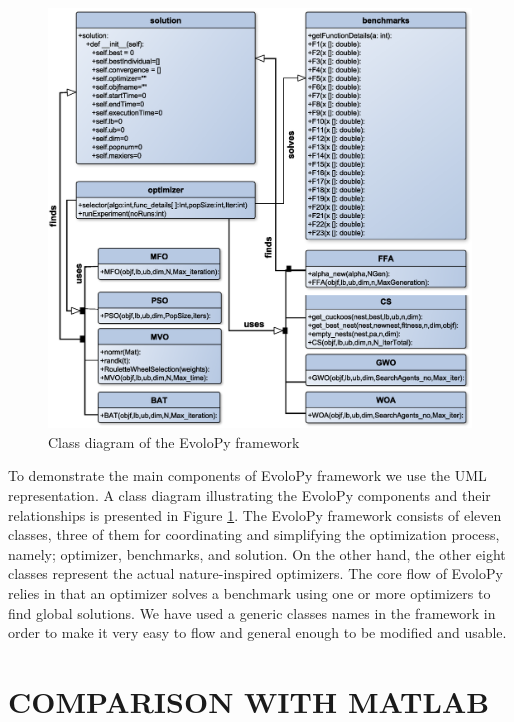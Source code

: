 \documentclass[a4paper,twoside]{article}
\begin{document}
\begin{figure}
\centerline{\includegraphics[scale=0.33]{classD.eps}}
\caption{Class diagram of the EvoloPy framework}
\label{fig:framework}
\end{figure}

To demonstrate the main components of EvoloPy framework we use the UML representation. A class diagram illustrating the EvoloPy components and their relationships is presented in Figure \ref{fig:framework}. The EvoloPy framework consists of eleven classes, three of them for coordinating and simplifying the optimization process, namely; optimizer, benchmarks, and solution. On the other hand, the other eight classes represent the actual nature-inspired optimizers. The core flow of EvoloPy relies in that an optimizer solves a benchmark using one or more optimizers to find global solutions. We have used a generic classes names in the framework in order to make it very easy to flow and general enough to be modified and usable.





\section{\uppercase{Comparison with Matlab}}
\end{document}
